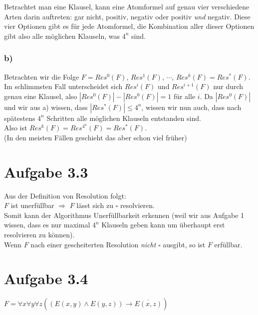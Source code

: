 \documentclass[a4paper,12pt]{article}
\begin{document}
	Betrachtet man eine Klausel, kann eine Atomformel auf genau vier verschiedene Arten darin auftreten: gar nicht, positiv, negativ oder positiv \textit{und} negativ. Diese vier Optionen gibt es für jede Atomformel, die Kombination aller dieser Optionen gibt also alle möglichen Klauseln, was $4^n$ sind. 
	
	\subsubsection*{b)}
	Betrachten wir die Folge $F = Res^0\left(F\right)$, $Res^1\left(F\right)$, $\cdots$, $Res^k\left(F\right) = Res^*\left(F\right)$.\\
	
	Im schlimmsten Fall unterscheidet sich $Res^i\left(F\right)$ und $Res^{i+1}\left(F\right)$ nur durch genau eine Klausel, also $\left|Res^0\left(F\right)\right| - \left|Res^0\left(F\right)\right| = 1$ für alle $i$. Da $\left|Res^0\left(F\right)\right|$ und wir aus a) wissen, dass $\left|Res^*\left(F\right)\right| \leq 4^n$, wissen wir nun auch, dass nach spätestens $4^n$ Schritten alle möglichen Klauseln entstanden sind.\\
	
	Also ist $Res^k\left(F\right) = Res^{4^n}\left(F\right) = Res^*\left(F\right)$.\\
	(In den meisten Fällen geschieht das aber schon viel früher)
	
	\section*{Aufgabe 3.3}
	Aus der Definition von Resolution folgt:\\
	
	$F$ ist unerfüllbar $\Rightarrow$ $F$ lässt sich zu $\square$ resolvieren.\\
	
	Somit kann der Algorithmus Unerfüllbarkeit erkennen (weil wir aus Aufgabe 1 wissen, dass es nur maximal $4^n$ Klauseln geben kann um überhaupt erst resolvieren zu können).\\
	Wenn $F$ nach einer gescheiterten Resolution \textit{nicht} $\square$ ausgibt, so ist $F$ erfüllbar. 
	
	
	\section*{Aufgabe 3.4}
	\begin{center}
		$F = \forall x \forall y \forall z \left(\left(E\left(x,y\right) \wedge E\left(y,z\right)\right) \rightarrow \overline{E\left(x,z\right)}\right)$
	\end{center}
\end{document}

